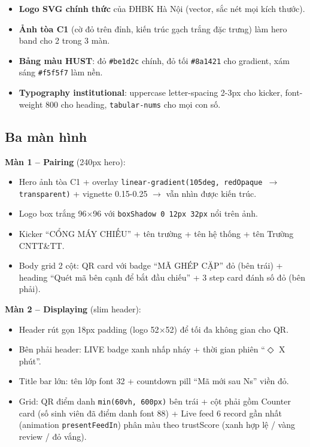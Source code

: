 \documentclass{article}
\begin{document}
\begin{itemize}[leftmargin=1.5em]
  \item \textbf{Logo SVG chính thức} của ĐHBK Hà Nội (vector, sắc nét mọi kích thước).
  \item \textbf{Ảnh tòa C1} (cờ đỏ trên đỉnh, kiến trúc gạch trắng đặc trưng) làm hero band cho 2 trong 3 màn.
  \item \textbf{Bảng màu HUST}: đỏ \texttt{\#be1d2c} chính, đỏ tối \texttt{\#8a1421} cho gradient, xám sáng \texttt{\#f5f5f7} làm nền.
  \item \textbf{Typography institutional}: uppercase letter-spacing 2-3px cho kicker, font-weight 800 cho heading, \texttt{tabular-nums} cho mọi con số.
\end{itemize}

\subsection{Ba màn hình}

\textbf{Màn 1 -- Pairing} (240px hero):

\begin{itemize}[leftmargin=1.5em]
  \item Hero ảnh tòa C1 + overlay \texttt{linear-gradient(105deg, redOpaque $\to$ transparent)} + vignette 0.15-0.25 $\to$ vẫn nhìn được kiến trúc.
  \item Logo box trắng 96$\times$96 với \texttt{boxShadow 0 12px 32px} nổi trên ảnh.
  \item Kicker ``CỔNG MÁY CHIẾU'' + tên trường + tên hệ thống + tên Trường CNTT\&TT.
  \item Body grid 2 cột: QR card với badge ``MÃ GHÉP CẶP'' đỏ (bên trái) + heading ``Quét mã bên cạnh để bắt đầu chiếu'' + 3 step card đánh số đỏ (bên phải).
\end{itemize}

\textbf{Màn 2 -- Displaying} (slim header):

\begin{itemize}[leftmargin=1.5em]
  \item Header rút gọn 18px padding (logo 52$\times$52) để tối đa không gian cho QR.
  \item Bên phải header: LIVE badge xanh nhấp nháy + thời gian phiên ``$\boldsymbol{\Diamond}$ X phút''.
  \item Title bar lớn: tên lớp font 32 + countdown pill ``Mã mới sau Ns'' viền đỏ.
  \item Grid: QR điểm danh \texttt{min(60vh, 600px)} bên trái + cột phải gồm Counter card (số sinh viên đã điểm danh font 88) + Live feed 6 record gần nhất (animation \texttt{presentFeedIn}) phân màu theo trustScore (xanh hợp lệ / vàng review / đỏ vắng).
\end{itemize}
\end{document}
